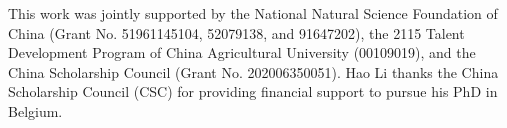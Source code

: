 \documentclass[hess, manuscript]{copernicus}
\begin{document}


\begin{acknowledgements}
This work was jointly supported by the National Natural Science Foundation of China (Grant No. 51961145104, 52079138, and 91647202), the 2115 Talent Development Program of China Agricultural University (00109019), and the China Scholarship Council (Grant No. 202006350051). Hao Li thanks the China Scholarship Council (CSC) for providing financial support to pursue his PhD in Belgium.
\end{acknowledgements}




\end{document}
